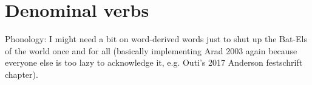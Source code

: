 

%
%
%  
%
%
%

\section{Denominal verbs}
	Phonology: I might need a bit on word-derived words just to shut up the Bat-Els of the world once and for all (basically implementing Arad 2003 again because everyone else is too lazy to acknowledge it, e.g. Outi's 2017 Anderson festschrift chapter).

